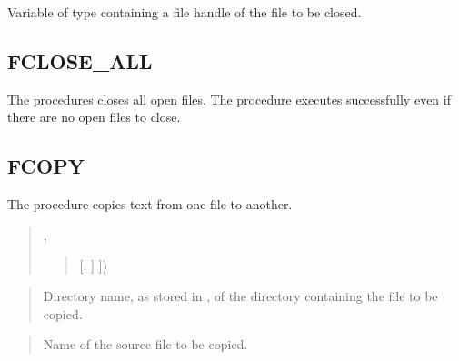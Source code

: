 \documentclass[letterpaper,10pt,english,openany,oneside]{sphinxmanual}
\begin{document}


Variable of type  containing a file handle of the file to be
closed.


\subsection{FCLOSE\_ALL}
\label{\detokenize{utl_file:fclose-all}}
The  procedures closes all open files. The procedure
executes successfully even if there are no open files to close.
\begin{quote}

\end{quote}


\subsection{FCOPY}
\label{\detokenize{utl_file:fcopy}}
The  procedure copies text from one file to another.
\begin{quote}

,
\begin{quote}


{[}, \sphinxcode{\textless{}start\_line\textgreater{} PLS\_INTEGER {[}, \textless{}end\_line\textgreater{} PLS\_INTEGER} {]} {]})
\end{quote}
\end{quote}


\begin{quote}

Directory name, as stored in , of the
directory containing the file to be copied.
\end{quote}

\begin{quote}

Name of the source file to be copied.
\end{quote}
\end{document}
